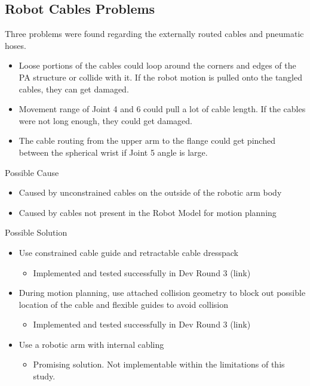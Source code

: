 \subsection{Robot Cables Problems}
Three problems were found regarding the externally routed cables and pneumatic hoses. 
\begin{itemize}
    \item Loose portions of the cables could loop around the corners and edges of the PA structure or collide with it. If the robot motion is pulled onto the tangled cables, they can get damaged.
    \item Movement range of Joint 4 and 6 could pull a lot of cable length. If the cables were not long enough, they could get damaged.
    \item The cable routing from the upper arm to the flange could get pinched between the spherical wrist if Joint 5 angle is large.
\end{itemize}


Possible Cause

\begin{itemize}
    \item Caused by unconstrained cables on the outside of the robotic arm body
    \item Caused by cables not present in the Robot Model for motion planning
\end{itemize}

Possible Solution
\begin{itemize}
    \item Use constrained cable guide and retractable cable dresspack
    \begin{itemize}
        \item Implemented and tested successfully in Dev Round 3 (link)
    \end{itemize}
    \item During motion planning, use attached collision geometry to block out possible location of the cable and flexible guides to avoid collision
    \begin{itemize}
        \item Implemented and tested successfully in Dev Round 3 (link)
    \end{itemize}
    \item Use a robotic arm with internal cabling
    \begin{itemize}
        \item Promising solution. Not implementable within the limitations of this study.
    \end{itemize}
\end{itemize}

